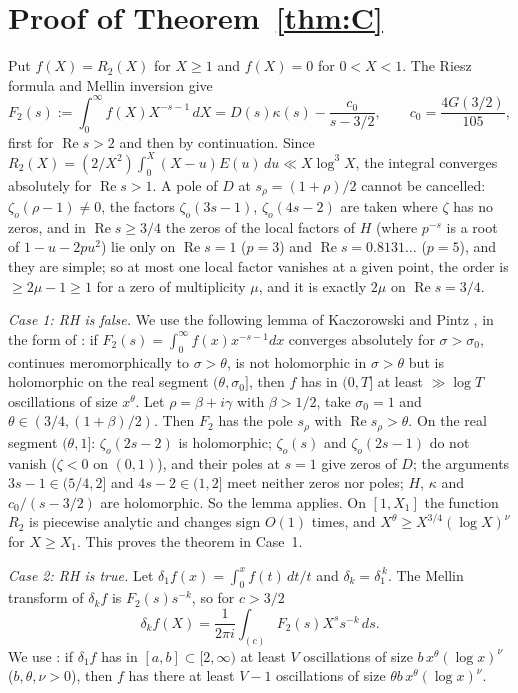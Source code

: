 \documentclass[11pt]{amsart}
\theoremstyle{remark}
\newcommand{\zo}{\zeta_{o}}
\begin{document}
\section{Proof of Theorem~\ref{thm:C}}\label{sec:C}

Put $f(X)=R_2(X)$ for $X\ge1$ and $f(X)=0$ for $0<X<1$. The Riesz formula and Mellin inversion give
\begin{equation}\label{eq:mellin}
F_2(s):=\int_0^\infty f(X)X^{-s-1}\,dX=D(s)\kappa(s)-\frac{c_0}{s-3/2},\qquad c_0=\frac{4G(3/2)}{105},
\end{equation}
first for $\operatorname{Re}s>2$ and then by continuation. Since $R_2(X)=(2/X^2)\int_0^X(X-u)E(u)\,du\ll X\log^3X$, the integral converges absolutely for $\operatorname{Re}s>1$. A pole of $D$ at $s_\rho=(1+\rho)/2$ cannot be cancelled: $\zo(\rho-1)\ne0$, the factors $\zo(3s-1)$, $\zo(4s-2)$ are taken where $\zeta$ has no zeros, and in $\operatorname{Re}s\ge3/4$ the zeros of the local factors of $H$ (where $p^{-s}$ is a root of $1-u-2pu^2$) lie only on $\operatorname{Re}s=1$ ($p=3$) and $\operatorname{Re}s=0.8131\ldots$ ($p=5$), and they are simple; so at most one local factor vanishes at a given point, the order is $\ge2\mu-1\ge1$ for a zero of multiplicity $\mu$, and it is exactly $2\mu$ on $\operatorname{Re}s=3/4$.

\emph{Case 1: RH is false.} We use the following lemma of Kaczorowski and Pintz \cite[Thm.~1]{KP}, in the form of \cite[Lemma~3.1]{KW09}: if $F_2(s)=\int_0^\infty f(x)x^{-s-1}dx$ converges absolutely for $\sigma>\sigma_0$, continues meromorphically to $\sigma>\theta$, is not holomorphic in $\sigma>\theta$ but is holomorphic on the real segment $(\theta,\sigma_0]$, then $f$ has in $(0,T]$ at least $\gg\log T$ oscillations of size $x^\theta$. Let $\rho=\beta+i\gamma$ with $\beta>1/2$, take $\sigma_0=1$ and $\theta\in(3/4,(1+\beta)/2)$. Then $F_2$ has the pole $s_\rho$ with $\operatorname{Re}s_\rho>\theta$. On the real segment $(\theta,1]$: $\zo(2s-2)$ is holomorphic; $\zo(s)$ and $\zo(2s-1)$ do not vanish ($\zeta<0$ on $(0,1)$), and their poles at $s=1$ give zeros of $D$; the arguments $3s-1\in(5/4,2]$ and $4s-2\in(1,2]$ meet neither zeros nor poles; $H$, $\kappa$ and $c_0/(s-3/2)$ are holomorphic. So the lemma applies. On $[1,X_1]$ the function $R_2$ is piecewise analytic and changes sign $O(1)$ times, and $X^\theta\ge X^{3/4}(\log X)^\nu$ for $X\ge X_1$. This proves the theorem in Case~1.

\emph{Case 2: RH is true.} Let $\delta_1f(x)=\int_0^xf(t)\,dt/t$ and $\delta_k=\delta_1^{\,k}$. The Mellin transform of $\delta_kf$ is $F_2(s)s^{-k}$, so for $c>3/2$
\[
\delta_kf(X)=\frac1{2\pi i}\int_{(c)}F_2(s)X^ss^{-k}\,ds.
\]
We use \cite[Lemma~5.4]{KW09}: if $\delta_1f$ has in $[a,b]\subset[2,\infty)$ at least $V$ oscillations of size $b\,x^\theta(\log x)^\nu$ ($b,\theta,\nu>0$), then $f$ has there at least $V-1$ oscillations of size $\theta b\,x^\theta(\log x)^\nu$.
\end{document}
